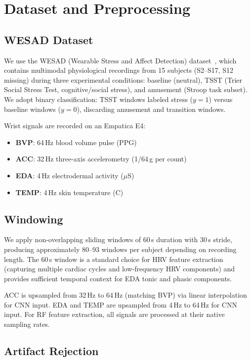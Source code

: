 \documentclass[10pt,twocolumn]{article}
\begin{document}
\section{Dataset and Preprocessing}
\label{sec:dataset}

\subsection{WESAD Dataset}

We use the WESAD (Wearable Stress and Affect Detection) dataset~\cite{schmidt2018wesad},
which contains multimodal physiological recordings from 15 subjects
(S2--S17, S12 missing) during three experimental conditions:
baseline (neutral), TSST (Trier Social Stress Test, cognitive/social stress),
and amusement (Stroop task subset). We adopt binary classification:
TSST windows labeled stress ($y=1$) versus baseline windows ($y=0$),
discarding amusement and transition windows.

Wrist signals are recorded on an Empatica E4:
\begin{itemize}
  \item \textbf{BVP}: 64\,Hz blood volume pulse (PPG)
  \item \textbf{ACC}: 32\,Hz three-axis accelerometry (1/64\,g per count)
  \item \textbf{EDA}: 4\,Hz electrodermal activity ($\mu$S)
  \item \textbf{TEMP}: 4\,Hz skin temperature (\textdegree C)
\end{itemize}

\subsection{Windowing}

We apply non-overlapping sliding windows of 60\,s duration with 30\,s stride,
producing approximately 80--93 windows per subject depending on recording length.
The 60\,s window is a standard choice for HRV feature extraction (capturing
multiple cardiac cycles and low-frequency HRV components) and provides
sufficient temporal context for EDA tonic and phasic components.

ACC is upsampled from 32\,Hz to 64\,Hz (matching BVP) via linear interpolation
for CNN input. EDA and TEMP are upsampled from 4\,Hz to 64\,Hz for CNN input.
For RF feature extraction, all signals are processed at their native sampling rates.

\subsection{Artifact Rejection}
\end{document}
